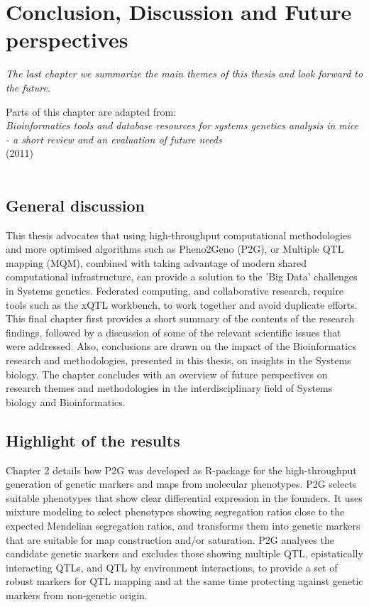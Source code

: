 \chapter{Conclusion, Discussion and Future perspectives}
\thispagestyle{empty}
\emph{The last chapter we summarize the main themes of this thesis and look forward to the future.}
\null
\vfill

\begin{myexampleblock}{Parts of this chapter are adapted from:}
  \\
  \emph{ Bioinformatics tools and database resources for systems genetics analysis in mice 
         - a short review and an evaluation of future needs}\\
   (2011)\\\\
\end{myexampleblock}

\newpage





\section{General discussion}
This thesis advocates that using high-throughput computational methodologies and more optimised algorithms such as Pheno2Geno (P2G), 
or Multiple QTL mapping (MQM), combined with taking advantage of modern shared computational infrastructure, can provide a solution 
to the ’Big Data’ challenges in Systems genetics. Federated computing, and collaborative research, require tools such as the xQTL 
workbench, to work together and avoid duplicate efforts. This final chapter first provides a short summary of the contents of the 
research findings, followed by a discussion of some of the relevant scientific issues that were addressed. Also, conclusions are drawn 
on the impact of the Bioinformatics research and methodologies, presented in this thesis, on insights in the Systems biology. The 
chapter concludes with an overview of future perspectives on research themes and methodologies in the interdisciplinary field of 
Systems biology and Bioinformatics.

\section{Highlight of the results}
Chapter 2 details how P2G was developed as R-package for the high-throughput generation of genetic markers and maps from molecular 
phenotypes. P2G selects suitable phenotypes that show clear differential expression in the founders. It uses mixture modeling to 
select phenotypes showing segregation ratios close to the expected Mendelian segregation ratios, and transforms them into genetic 
markers that are suitable for map construction and/or saturation. P2G analyses the candidate genetic markers and excludes those 
showing multiple QTL, epistatically interacting QTLs, and QTL by environment interactions, to provide a set of robust markers for 
QTL mapping and at the same time protecting against genetic markers from non-genetic origin.

